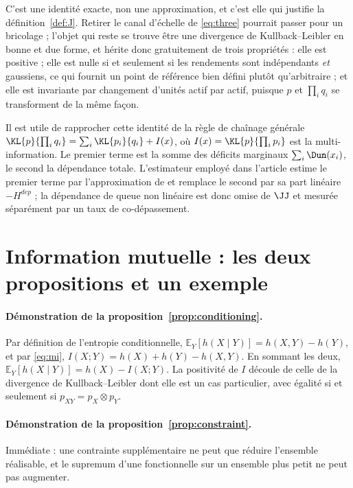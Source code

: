 C'est une identité exacte, non une approximation, et c'est elle qui justifie la
définition~\ref{def:J}. Retirer le canal d'échelle de \eqref{eq:three} pourrait
passer pour un bricolage ; l'objet qui reste se trouve être une divergence de
Kullback--Leibler en bonne et due forme, et hérite donc gratuitement de trois
propriétés : elle est positive ; elle est nulle si et seulement si les rendements
sont indépendants \emph{et} gaussiens, ce qui fournit un point de référence bien
défini plutôt qu'arbitraire ; et elle est invariante par changement d'unités
actif par actif, puisque $p$ et $\prod_i q_i$ se transforment de la même façon.

Il est utile de rapprocher cette identité de la règle de chaînage générale
$\KL{p}{\prod_i q_i}=\sum_i\KL{p_i}{q_i}+I(x)$, où
$I(x)=\KL{p}{\prod_i p_i}$ est la multi-information. Le premier terme est la
somme des déficits marginaux $\sum_i\Dun(x_i)$, le second la dépendance totale.
L'estimateur employé dans l'article estime le premier terme par l'approximation
de \citet{hyvarinen1998} et remplace le second par sa part linéaire
$-H^{dep}$ ; la dépendance de queue non linéaire est donc omise de $\JJ$ et
mesurée séparément par un taux de co-dépassement.

\section{Information mutuelle : les deux propositions et un exemple}
\label{app:mi}

\paragraph{Démonstration de la proposition~\ref{prop:conditioning}.} Par
définition de l'entropie conditionnelle,
$\mathbb{E}_Y[h(X\mid Y)]=h(X,Y)-h(Y)$, et par
\eqref{eq:mi}, $I(X;Y)=h(X)+h(Y)-h(X,Y)$. En sommant les deux,
$\mathbb{E}_Y[h(X\mid Y)]=h(X)-I(X;Y)$. La positivité de $I$ découle de celle de
la divergence de Kullback--Leibler dont elle est un cas particulier, avec
égalité si et seulement si $p_{XY}=p_X\otimes p_Y$.

\paragraph{Démonstration de la proposition~\ref{prop:constraint}.} Immédiate :
une contrainte supplémentaire ne peut que réduire l'ensemble réalisable, et le
supremum d'une fonctionnelle sur un ensemble plus petit ne peut pas augmenter.

